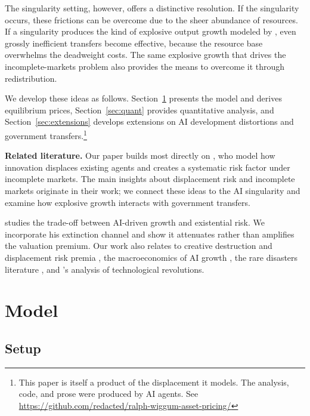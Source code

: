 \documentclass[12pt]{article}
\begin{document}
The singularity setting, however, offers a distinctive resolution. If the singularity occurs, these frictions can be overcome due to the sheer abundance of resources. If a singularity produces the kind of explosive output growth modeled by \citet{Jones2024}, even grossly inefficient transfers become effective, because the resource base overwhelms the deadweight costs. The same explosive growth that drives the incomplete-markets problem also provides the means to overcome it through redistribution.

We develop these ideas as follows. Section~\ref{sec:model} presents the model and derives equilibrium prices, Section~\ref{sec:quant} provides quantitative analysis, and Section~\ref{sec:extensions} develops extensions on AI development distortions and government transfers.\footnote{This paper is itself a product of the displacement it models. The analysis, code, and prose were produced by AI agents. See \url{https://github.com/redacted/ralph-wiggum-asset-pricing/}}

\medskip
\noindent\textbf{Related literature.}
Our paper builds most directly on \citet{GKP2012}, who model how innovation displaces existing agents and creates a systematic risk factor under incomplete markets. The main insights about displacement risk and incomplete markets originate in their work; we connect these ideas to the AI singularity and examine how explosive growth interacts with government transfers.

\citet{Jones2024} studies the trade-off between AI-driven growth and existential risk. We incorporate his extinction channel and show it attenuates rather than amplifies the valuation premium. Our work also relates to creative destruction and displacement risk premia \citep{KoganPapanikolaou2014,KoganPapanikolaouStoffman2020,Knesl2023}, the macroeconomics of AI growth \citep{AghionJonesJones2019,Acemoglu2025}, the rare disasters literature \citep{Barro2006,Wachter2013}, and \citet{PastorVeronesi2009}'s analysis of technological revolutions.

\section{Model} \label{sec:model} %

\subsection{Setup} %
\end{document}
